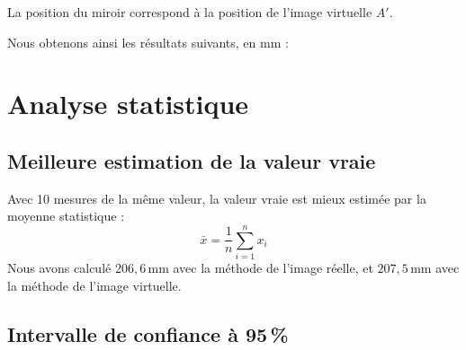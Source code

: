\documentclass[a4paper,11pt]{article}
\begin{document}
La position du miroir correspond à la position de l'image virtuelle $A'$.

Nous obtenons ainsi les résultats suivants, en mm :

\begin{table}[h]
  \centering
  \caption{Données de mesure par image virtuelle (distances en mm).}
\end{table}

\section{Analyse statistique}

\subsection{Meilleure estimation de la valeur vraie}

Avec 10 mesures de la même valeur, la valeur vraie est mieux estimée par la moyenne statistique :
\[
  \bar{x} = \frac{1}{n}\sum_{i=1}^{n} x_i
\]
Nous avons calculé $206{,}6$\,mm avec la méthode de l'image réelle, et $207{,}5$\,mm avec la méthode de l'image virtuelle.

\subsection{Intervalle de confiance à 95\,\%}
\end{document}
